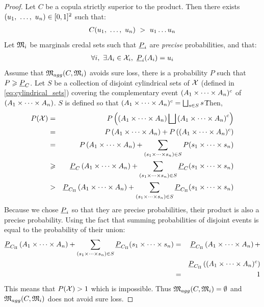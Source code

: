 \begin{proof}
    Let $C$ be a copula strictly superior to the product. Then there exists $(u_1 , ~\dots, ~ u_n)\in[0,1]^2$ such that:
    \begin{eqnarray*}
        C(u_1 , ~\dots, ~  u_n)~>~u_1\dots u_n
    \end{eqnarray*}
    Let $\mathfrak{M}_i$ be marginals credal sets such that $\underline{P}_i$ are \textit{precise} probabilities, and that:
    \begin{eqnarray*}
        \forall i,~\exists A_i\in\mathcal{X}_i,~\underline{P}_i(A_i)=u_i
    \end{eqnarray*}
    Assume that $\mathfrak{M}_{agg}(C, \mathfrak{M}_i)$ avoids sure loss, \ie there is a probability $P$ such that $P\geqslant\underline{P}_C$. Let $S$ be a collection of disjoint cylindrical sets of $\mathcal{X}$ (defined in \cref{eq:cylindrical_sets}) covering the complementary event $(A_1\times\dots\times A_n)^c$ of $(A_1\times\dots\times A_n)$. $S$ is defined so that $(A_1\times\dots\times A_n)^c=\bigsqcup_{s\in S}s$\.
    Then,
    \begin{eqnarray*}
        P(\mathcal{X}) &=& P\left(\left(A_1\times\dots\times A_n\right)\bigsqcup\left(A_1\times\dots\times A_n\right)^c\right)\\
        &=& P\left(A_1\times\dots\times A_n\right)+P\left((A_1\times\dots\times A_n)^c\right)\\
        &=& P\left(A_1\times\dots\times A_n\right)+\sum_{(s_1\times\dots\times s_n)\in S}P(s_1\times\dots\times s_n)\\
        &\geqslant& \underline{P}_C\left(A_1\times\dots\times A_n\right)+\sum_{(s_1\times\dots\times s_n)\in S}\underline{P}_C(s_1\times\dots\times s_n)\\
        &>& \underline{P}_{C_\Pi}\left(A_1\times\dots\times A_n\right)+\sum_{(s_1\times\dots\times s_n)\in S}\underline{P}_{C_\Pi}(s_1\times\dots\times s_n)
    \end{eqnarray*}
    Because we chose $\underline{P}_i$ so that they are precise probabilities, their product is also a precise probability. Using the fact that summing probabilities of disjoint events is equal to the probability of their union:
    \begin{eqnarray*}
        \underline{P}_{C_\Pi}\left(A_1\times\dots\times A_n\right)+\sum_{(s_1\times\dots\times s_n)\in S}\underline{P}_{C_\Pi}(s_1\times\dots\times s_n) &=& \underline{P}_{C_\Pi}\left(A_1\times\dots\times A_n\right)+\\
        &&\underline{P}_{C_\Pi}\left((A_1\times\dots\times A_n)^c\right)\\
        &=& 1
    \end{eqnarray*}
    This means that $P(\mathcal{X})>1$ which is impossible. Thus $\mathfrak{M}_{agg}(C, \mathfrak{M}_i)=\emptyset$ and $\mathfrak{M}_{agg}(C, \mathfrak{M}_i)$ does not avoid sure loss.
\end{proof}

